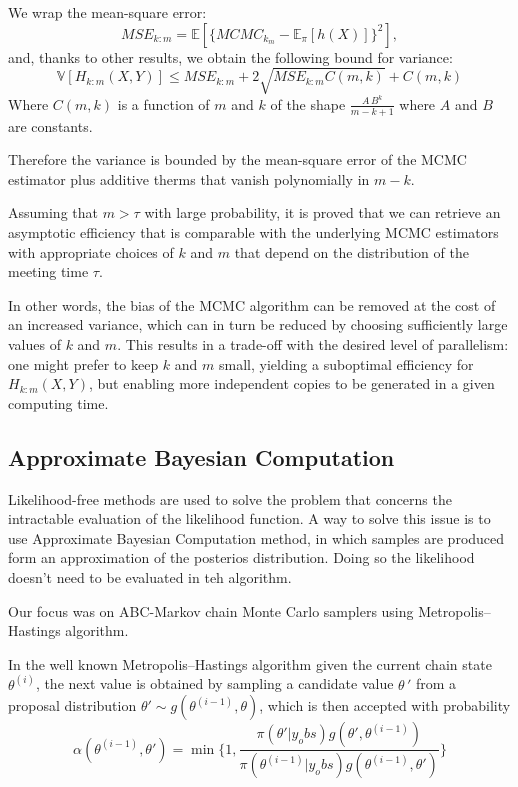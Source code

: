 \documentclass {article}
\begin{document}
We wrap the mean-square error:
$$
MSE_{k:m}=  \mathbb{E}[\{MCMC_{k_m} - \mathbb{E}_\pi[h(X)]\}^2],
$$
and, thanks to other results, we obtain the following bound for variance:
$$
\mathbb{V}[H_{k:m}(X,Y)]
\leq MSE_{k:m} + 2 \sqrt{MSE_{k:m} C(m,k)} + C(m,k)
$$
Where $C(m,k)$ is a function of $m$ and $k$ of the shape $\frac{A \, B^k}{m-k+1}$ where $A$ and $B$ are constants.

Therefore the variance is bounded by the mean-square error of the MCMC estimator plus additive therms that vanish polynomially in $m-k$.

Assuming that $m > \tau$ with large probability, it is proved that we can retrieve an asymptotic efficiency that is comparable with the underlying MCMC estimators with appropriate choices of $k$ and $m$ that depend on the distribution of the meeting time $\tau$.

In other words, the bias of the MCMC algorithm can be removed at the cost of an increased variance, which can in turn be reduced by choosing sufficiently large values of $k$ and $m$. This results in a trade-off with the desired level of parallelism: one might prefer to keep $k$ and $m$ small, yielding a suboptimal efficiency for $H_{k:m}(X,Y)$, but enabling more independent copies to be generated in a given computing time.


\subsection{Approximate Bayesian Computation}

Likelihood-free methods are used to solve the problem that concerns the intractable evaluation of the likelihood function. A way to solve this issue is to use Approximate Bayesian Computation method, in which samples are produced form an approximation of the posterios distribution.
Doing so the likelihood doesn't need to be evaluated in teh algorithm.

Our focus was on ABC-Markov chain Monte Carlo samplers using Metropolis–Hastings algorithm.

In the well known Metropolis–Hastings algorithm given the current chain state $\theta^{(i)}$, the next value is obtained by sampling a candidate value $\theta \,'$ from a proposal distribution $\theta' \sim g(\theta^{(i-1)},\theta)$, which is then accepted with probability
 $$ \alpha(\theta^{(i-1)},\theta')= \min  \{ 1, \frac{\pi(\theta'|y_obs)g(\theta',\theta^{(i-1)})}{\pi(\theta^{(i-1)}|y_obs)g(\theta^{(i-1)},\theta') } \} $$
\end{document}

